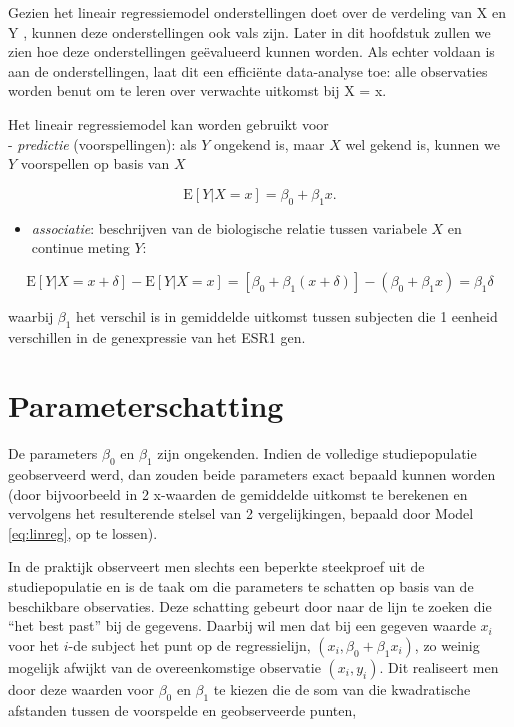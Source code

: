\documentclass[
  12pt,dutch,coursenotes]{book}
\providecommand{\tightlist}{%
  \setlength{\itemsep}{0pt}\setlength{\parskip}{0pt}}
\theoremstyle{definition}
\theoremstyle{definition}
\theoremstyle{definition}
\theoremstyle{definition}
\theoremstyle{remark}
\begin{document}
Gezien het lineair regressiemodel onderstellingen doet over de verdeling van X en Y , kunnen deze onderstellingen ook vals zijn. Later in dit hoofdstuk zullen we zien hoe deze onderstellingen geëvalueerd kunnen worden. Als echter voldaan is aan de onderstellingen, laat dit een efficiënte data-analyse toe: alle observaties worden benut om te leren over verwachte uitkomst bij X = x.

Het lineair regressiemodel kan worden gebruikt voor\\
- \emph{predictie} (voorspellingen): als \(Y\) ongekend is, maar \(X\) wel gekend is, kunnen we \(Y\) voorspellen op basis van \(X\)

\[\text{E}\left[Y|X =x\right]=\beta_0 + \beta_1 x.\]

\begin{itemize}
\tightlist
\item
  \emph{associatie}: beschrijven van de biologische relatie tussen variabele \(X\) en continue meting \(Y\):
\end{itemize}

\[\text{E}\left[Y|X=x+\delta\right]-\text{E}\left[Y|X=x\right]= \left[\beta_0+\beta_1(x+\delta)\right]-(\beta_0+\beta_1x)=\beta_1\delta\]

waarbij \(\beta_1\) het verschil is in gemiddelde uitkomst tussen subjecten die 1 eenheid verschillen in de genexpressie van het ESR1 gen.

\hypertarget{parameterschatting}{%
\section{Parameterschatting}\label{parameterschatting}}

De parameters \(\beta_0\) en \(\beta_1\) zijn ongekenden. Indien de volledige
studiepopulatie geobserveerd werd, dan zouden beide parameters exact
bepaald kunnen worden (door bijvoorbeeld in 2 x-waarden de gemiddelde uitkomst te berekenen en vervolgens het resulterende stelsel van 2 vergelijkingen, bepaald door Model \eqref{eq:linreg}, op te lossen).

In de praktijk observeert men slechts een beperkte steekproef uit de studiepopulatie en is de taak om die parameters te schatten op basis van de beschikbare observaties.
Deze schatting gebeurt door naar de lijn te zoeken die ``het
best past'' bij de gegevens. Daarbij wil men dat bij een gegeven waarde \(x_i\) voor het \(i\)-de subject het punt op de regressielijn, \((x_i, \beta_0 + \beta_1 x_i)\), zo weinig mogelijk afwijkt van de overeenkomstige observatie \((x_i, y_i)\). Dit realiseert men door deze waarden voor \(\beta_0\) en \(\beta_1\) te
kiezen die de som van die kwadratische afstanden tussen de voorspelde en
geobserveerde punten,
\end{document}
